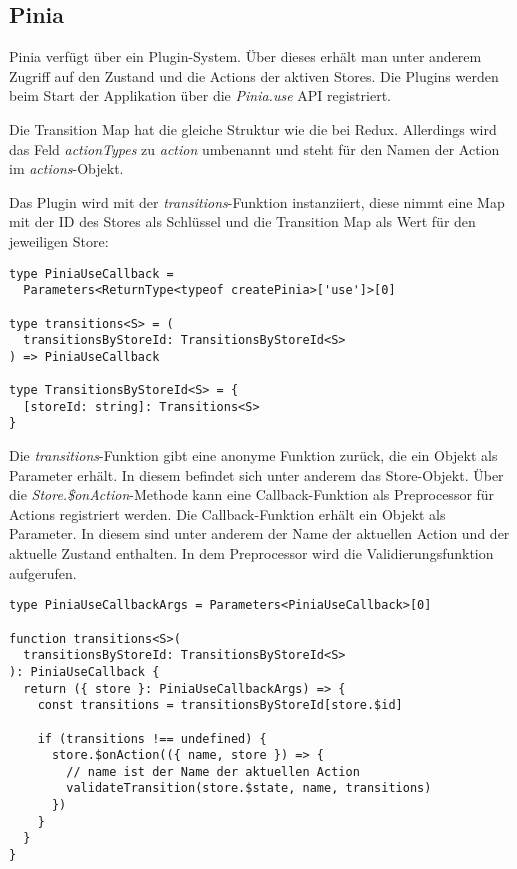 \subsection{Pinia}

Pinia verfügt über ein Plugin-System. Über dieses erhält man unter anderem Zugriff auf den Zustand und die Actions der aktiven Stores. Die Plugins werden beim Start der Applikation über die \textit{Pinia.use} API registriert.\cite{piniaPluginSystem}

Die Transition Map hat die gleiche Struktur wie die bei Redux. Allerdings wird das Feld \textit{actionTypes} zu \textit{action} umbenannt und steht für den Namen der Action im \textit{actions}-Objekt.

Das Plugin wird mit der \textit{transitions}-Funktion instanziiert, diese nimmt eine Map mit der ID des Stores als Schlüssel und die Transition Map als Wert für den jeweiligen Store:

\begin{lstlisting}
type PiniaUseCallback =
  Parameters<ReturnType<typeof createPinia>['use']>[0]

type transitions<S> = (
  transitionsByStoreId: TransitionsByStoreId<S>
) => PiniaUseCallback

type TransitionsByStoreId<S> = {
  [storeId: string]: Transitions<S>
}
\end{lstlisting}

Die \textit{transitions}-Funktion gibt eine anonyme Funktion zurück, die ein Objekt als Parameter erhält. In diesem befindet sich unter anderem das Store-Objekt. Über die \textit{Store.\$onAction}-Methode kann eine Callback-Funktion als Preprocessor für Actions registriert werden. Die Callback-Funktion erhält ein Objekt als Parameter. In diesem sind unter anderem der Name der aktuellen Action und der aktuelle Zustand enthalten. In dem Preprocessor wird die Validierungsfunktion aufgerufen.

\begin{lstlisting}  
type PiniaUseCallbackArgs = Parameters<PiniaUseCallback>[0]

function transitions<S>(
  transitionsByStoreId: TransitionsByStoreId<S>
): PiniaUseCallback {
  return ({ store }: PiniaUseCallbackArgs) => {
    const transitions = transitionsByStoreId[store.$id]
  
    if (transitions !== undefined) {
      store.$onAction(({ name, store }) => {
        // name ist der Name der aktuellen Action
        validateTransition(store.$state, name, transitions)
      })
    }
  }
}  
\end{lstlisting}

